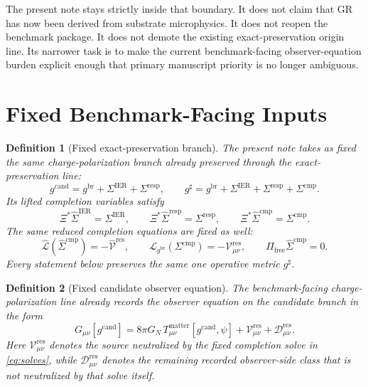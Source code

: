 \documentclass[11pt]{article}
\newcommand{\ObserverMap}{\Xi}
\newcommand{\ObserverMetric}{g^{\mathrm{br}}}
\newcommand{\CandidateMetric}{g^{\mathrm{cand}}}
\newcommand{\CompletedMetric}{g^{\sharp}}
\newcommand{\BaseShift}{\Sigma^{\mathrm{IER}}}
\newcommand{\ResponseShift}{\Sigma^{\mathrm{resp}}}
\newcommand{\CompShift}{\Sigma^{\mathrm{cmp}}}
\newcommand{\BaseLift}{\widehat\Sigma^{\mathrm{IER}}}
\newcommand{\ResponseLift}{\widehat\Sigma^{\mathrm{resp}}}
\newcommand{\CompLift}{\widehat\Sigma^{\mathrm{cmp}}}
\newcommand{\ResidualCore}{\mathcal V_{\mu\nu}^{\mathrm{res}}}
\newcommand{\ResidualDec}{\mathcal D_{\mu\nu}^{\mathrm{res}}}
\newcommand{\ResidualLift}{\widehat{\mathcal V}^{\mathrm{res}}}
\newcommand{\SubReducedEin}{\widehat{\mathcal L}}
\newcommand{\FreeProj}{\Pi_{\mathrm{free}}}
\newcommand{\ReducedEin}{\mathcal L_{\ObserverMetric}}
\newtheorem{definition}{Definition}
\begin{document}
The present note stays strictly inside that boundary. It does not claim that GR has now been derived from substrate microphysics. It does not reopen the benchmark package. It does not demote the existing exact-preservation origin line. Its narrower task is to make the current benchmark-facing observer-equation burden explicit enough that primary manuscript priority is no longer ambiguous.

\section{Fixed Benchmark-Facing Inputs}

\begin{definition}[Fixed exact-preservation branch]
\label{def:fixedbranch}
The present note takes as fixed the same charge-polarization branch already preserved through the exact-preservation line:
\begin{equation}
\CandidateMetric
=
\ObserverMetric+\BaseShift+\ResponseShift,
\qquad
\CompletedMetric
=
\ObserverMetric+\BaseShift+\ResponseShift+\CompShift.
\label{eq:metrics}
\end{equation}
Its lifted completion variables satisfy
\begin{equation}
\ObserverMap^*\BaseLift=\BaseShift,
\qquad
\ObserverMap^*\ResponseLift=\ResponseShift,
\qquad
\ObserverMap^*\CompLift=\CompShift.
\label{eq:lifts}
\end{equation}
The same reduced completion equations are fixed as well:
\begin{equation}
\SubReducedEin(\CompLift)=-\ResidualLift,
\qquad
\ReducedEin(\CompShift)=-\ResidualCore,
\qquad
\FreeProj\CompLift=0.
\label{eq:solves}
\end{equation}
Every statement below preserves the same one operative metric \(\CompletedMetric\).
\end{definition}

\begin{definition}[Fixed candidate observer equation]
\label{def:candidateeq}
The benchmark-facing charge-polarization line already records the observer equation on the candidate branch in the form
\begin{equation}
G_{\mu\nu}[\CandidateMetric]
=
8\pi G_N\,T_{\mu\nu}^{\mathrm{matter}}[\CandidateMetric,\psi]
+\ResidualCore
+\ResidualDec.
\label{eq:candidate}
\end{equation}
Here \(\ResidualCore\) denotes the source neutralized by the fixed completion solve in \eqref{eq:solves}, while \(\ResidualDec\) denotes the remaining recorded observer-side class that is not neutralized by that solve itself.
\end{definition}
\end{document}
